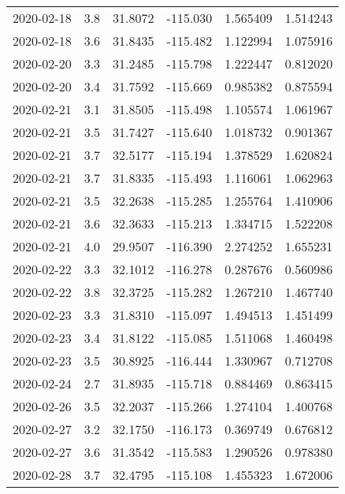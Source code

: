 \begin{tabular}{lrrrrr}
2020-02-18 &       3.8 &  31.8072 &  -115.030 &         1.565409 &         1.514243 \\
2020-02-18 &       3.6 &  31.8435 &  -115.482 &         1.122994 &         1.075916 \\
2020-02-20 &       3.3 &  31.2485 &  -115.798 &         1.222447 &         0.812020 \\
2020-02-20 &       3.4 &  31.7592 &  -115.669 &         0.985382 &         0.875594 \\
2020-02-21 &       3.1 &  31.8505 &  -115.498 &         1.105574 &         1.061967 \\
2020-02-21 &       3.5 &  31.7427 &  -115.640 &         1.018732 &         0.901367 \\
2020-02-21 &       3.7 &  32.5177 &  -115.194 &         1.378529 &         1.620824 \\
2020-02-21 &       3.7 &  31.8335 &  -115.493 &         1.116061 &         1.062963 \\
2020-02-21 &       3.5 &  32.2638 &  -115.285 &         1.255764 &         1.410906 \\
2020-02-21 &       3.6 &  32.3633 &  -115.213 &         1.334715 &         1.522208 \\
2020-02-21 &       4.0 &  29.9507 &  -116.390 &         2.274252 &         1.655231 \\
2020-02-22 &       3.3 &  32.1012 &  -116.278 &         0.287676 &         0.560986 \\
2020-02-22 &       3.8 &  32.3725 &  -115.282 &         1.267210 &         1.467740 \\
2020-02-23 &       3.3 &  31.8310 &  -115.097 &         1.494513 &         1.451499 \\
2020-02-23 &       3.4 &  31.8122 &  -115.085 &         1.511068 &         1.460498 \\
2020-02-23 &       3.5 &  30.8925 &  -116.444 &         1.330967 &         0.712708 \\
2020-02-24 &       2.7 &  31.8935 &  -115.718 &         0.884469 &         0.863415 \\
2020-02-26 &       3.5 &  32.2037 &  -115.266 &         1.274104 &         1.400768 \\
2020-02-27 &       3.2 &  32.1750 &  -116.173 &         0.369749 &         0.676812 \\
2020-02-27 &       3.6 &  31.3542 &  -115.583 &         1.290526 &         0.978380 \\
2020-02-28 &       3.7 &  32.4795 &  -115.108 &         1.455323 &         1.672006 \\

\end{tabular}
